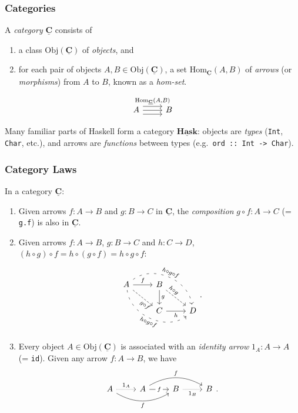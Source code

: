 \documentclass[10pt]{beamer}
\newcommand{\Cat}[1]{\ensuremath{\underline{\mathbf{#1}}}}
\newcommand{\Obj}[1]{\ensuremath{\mathrm{Obj}(\Cat{#1})}}
\newcommand{\Hom}[3]{\ensuremath{\mathrm{Hom}_{\Cat{#1}}(#2,#3)}}
\theoremstyle{definition}
\theoremstyle{remark}
\numberwithin{equation}{section}
\begin{document}
\begin{frame}[fragile]
  \frametitle{Categories}

  A \emph{category} $\Cat{C}$ consists of
  \begin{enumerate}
  \item a class $\Obj{C}$ of \emph{objects}, and
  \item for each pair of objects $A,B \in \Obj{C}$, a set $\Hom{C}{A}{B}$
    of \emph{arrows} (or \emph{morphisms}) from $A$ to $B$, known as
    a \emph{hom-set}.
  \end{enumerate}\vspace{-1.5\baselineskip}

  \[
    \begin{tikzcd}
      A \arrow[shift left=2]{r}{\Hom{C}{A}{B}} \arrow{r} \arrow[shift right=2]{r} & B
    \end{tikzcd}
  \]

  Many familiar parts of Haskell form a category \Cat{Hask}:
  objects are \emph{types} (\lstinline{Int}, \lstinline{Char}, etc.),
  and arrows are \emph{functions} between types (e.g.\ \lstinline{ord :: Int -> Char}).
\end{frame}

\begin{frame}[fragile]
  \frametitle{Category Laws}
  In a category $\Cat{C}$:
  \begin{enumerate}
  \item Given arrows $f\colon A \rightarrow B$ and $g\colon B \rightarrow C$ in
    $\Cat{C}$, the \emph{composition} $g \circ f \colon A \rightarrow C$ (= \lstinline{g.f}) is also in
    $\Cat{C}$.
  \item Given arrows $f\colon A \rightarrow B$, $g\colon B \rightarrow C$ and $h\colon C \rightarrow D$, $(h \circ
    g) \circ f = h \circ (g \circ f) = h \circ g \circ f$:\vspace{-0.5\baselineskip}
    \[
      \begin{tikzcd}
        A \arrow{r}{f} \arrow[sloped,near end,swap,dashed]{dr}{g \circ f} \arrow[bend
        right=60,sloped,swap,loosely dashed]{drr}{h \circ g \circ f} \arrow[bend
        left=60,sloped,loosely dashed]{drr}{h
          \circ g \circ f} & B \arrow{d}{g}
        \arrow[sloped,near start,dashed]{dr}{h \circ g} & \\
          & C \arrow[swap]{r}{h} & D
      \end{tikzcd}\rlap{.}
    \]
  \item Every object $A \in \Obj{C}$ is associated with an \emph{identity arrow}
    $1_A \colon A \rightarrow A$ (= \lstinline{id}). Given any arrow $f\colon A \rightarrow B$, we have
    \[
      \begin{tikzcd}
        A \arrow[densely dotted]{r}{1_A} \arrow[bend right=30,swap]{rr}{f} & A
        \arrow["f" description]{r}
        \arrow[bend left=30]{rr}{f} & B \arrow[swap,densely dotted]{r}{1_B} & B
      \end{tikzcd}\rlap{.}
    \]
  \end{enumerate}
\end{frame}
\end{document}
